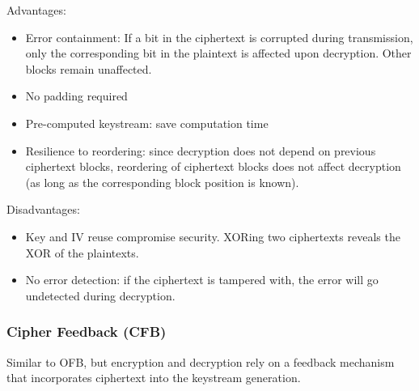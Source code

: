 Advantages:
\begin{itemize}
    \item Error containment: If a bit in the ciphertext is corrupted during transmission, only the corresponding bit in the plaintext is affected upon decryption. Other blocks remain unaffected.
    \item No padding required
    \item Pre-computed keystream: save computation time
    \item Resilience to reordering: since decryption does not depend on previous ciphertext blocks, reordering of ciphertext blocks does not affect decryption (as long as the corresponding block position is known).
\end{itemize}

Disadvantages:
\begin{itemize}
    \item Key and IV reuse compromise security. XORing two ciphertexts reveals the XOR of the plaintexts.
    \item No error detection: if the ciphertext is tampered with, the error will go undetected during decryption.
\end{itemize}


\subsubsection{Cipher Feedback (CFB)}
Similar to OFB, but encryption and decryption rely on a feedback mechanism that incorporates ciphertext into the keystream generation.

